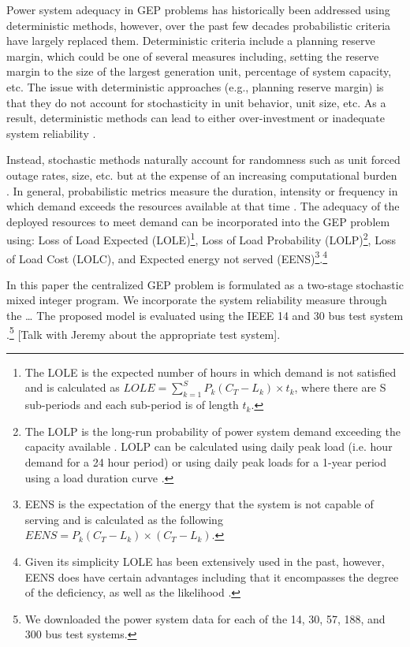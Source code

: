 \documentclass[10pt]{amsart}
\begin{document}
Power system adequacy in GEP problems has historically been addressed using deterministic methods, however, over the past few decades probabilistic criteria have largely replaced them.
Deterministic criteria include a planning reserve margin, which could be one of several measures including, setting the reserve margin to the size of the largest generation unit, percentage of system capacity, etc. 
The issue with deterministic approaches (e.g., planning reserve margin) is that they do not account for stochasticity in unit behavior, unit size, etc.
As a result, deterministic methods can lead to either over-investment or inadequate system reliability \parencite{aghaei:2013aa}.

Instead, stochastic methods naturally account for randomness such as unit forced outage rates, size, etc. but at the expense of an increasing computational burden \parencite{aghaei:2013aa}.  
In general, probabilistic metrics measure the duration, intensity or frequency in which demand exceeds the resources available at that time \parencite{dragoon:2006aa}.  	
The adequacy of the deployed resources to meet demand can be incorporated into the GEP problem using: Loss of Load Expected (LOLE)\footnote{The LOLE is the expected number of hours in which demand is not satisfied and is calculated as $LOLE = \sum_{k=1}^S P_k\left(C_T - L_k \right)\times t_k$, where there are S sub-periods and each sub-period is of length $t_k$.}, Loss of Load Probability (LOLP)\footnote{The LOLP is the long-run probability of power system demand exceeding the capacity available \parencite{endrenyi:1978}.  
LOLP can be calculated using daily peak load (i.e. hour demand for a 24 hour period) or using daily peak loads for a 1-year period using a load duration curve \parencite{endrenyi:1978}.}, Loss of Load Cost (LOLC), and Expected energy not served (EENS)\footnote{EENS is the expectation of the energy that the system is not capable of serving and is calculated as the following $EENS = P_k \left(C_T - L_k \right)\times \left(C_T- L_k \right)$.}.\footnote{Given its simplicity LOLE has been extensively used in the past, however, EENS does have certain advantages including that it encompasses the degree of the deficiency, as well as the likelihood \parencite[p622]{murugan2009nsga}.}

In this paper the centralized GEP problem is formulated as a two-stage stochastic mixed integer program.
We incorporate the system reliability measure through the \ldots
The proposed model is evaluated using the IEEE 14 and 30 bus test system \parencite{christie:2009aa}.\footnote{We downloaded the power system data for each of the 14, 30, 57, 188, and 300 bus test systems.}  
[Talk with Jeremy about the appropriate test system].
\end{document}
